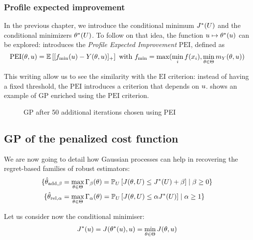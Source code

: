\documentclass[../../Main_ManuscritThese.tex]{subfiles}
\newcommand\imgpath{/home/victor/acadwriting/Manuscrit/Text/Chapter4/img/}
\begin{document}
\subsubsection{Profile expected improvement}
In the previous chapter, we introduce the conditional minimum $J^*(U)$ and the conditional minimizers $\theta^*(U)$. To follow on that idea, the function $u \mapsto \theta^*(u)$ can be explored: \cite{ginsbourger_bayesian_2014} introduces the \emph{Profile Expected Improvement} $\mathrm{PEI}$, defined as
\begin{equation}
  \label{eq:def_PEI}
  \mathrm{PEI}(\theta, u)= \mathbb{E}\left[[f_{\min}(u) - Y(\theta, u)]_+\right] \text{ with } f_{\min} = \max(\min_i f(x_i), \min_{\theta \in \Theta} m_Y(\theta, u))
\end{equation}

This writing allow us to see the similarity with the $\mathrm{EI}$ criterion: instead of having a fixed threshold, the $\mathrm{PEI}$ introduces a criterion that depends on $u$.  shows an example of GP enriched using the $\mathrm{PEI}$ criterion.

\begin{figure}[ht]
  \centering
  
  \caption{\label{fig:example_PEI} GP after 50 additional iterations chosen using PEI }
\end{figure}




\subsection{GP of the penalized cost function}
\label{ssec:gp_delta_alpha}

We are now going to detail how Gaussian processes can help in recovering the regret-based families of robust estimators:
\begin{align}
  \{ \hat{\theta}_{\mathrm{add,\beta}} &= \max_{\theta\in\Theta} \Gamma_\beta(\theta) = \mathbb{P}_{U}\left[J(\theta, U) \leq J^*(U) + \beta \right] \mid \beta \geq 0 \} \\
\{ \hat{\theta}_{\mathrm{rel,\alpha}} &= \max_{\theta\in\Theta} \Gamma_\alpha(\theta) = \mathbb{P}_{U}\left[J(\theta, U) \leq \alpha J^*(U)\right] \mid \alpha \geq 1 \}
\end{align}

Let us consider now the conditional minimiser:
\begin{align}
  J^*(u) = J(\theta^*(u),u) = \min_{\theta\in\Theta} J(\theta,u)
\end{align}
\end{document}
